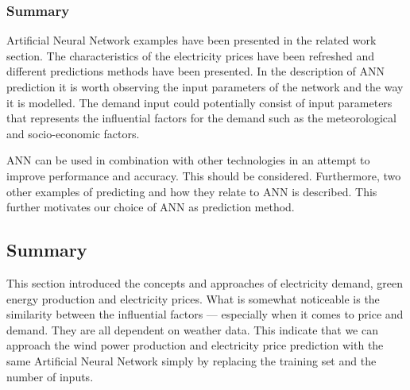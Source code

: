 \subsubsection{Summary}
Artificial Neural Network examples have been presented in the related work section. The characteristics of the electricity prices have been refreshed and different predictions methods have been presented. 
In the description of ANN prediction it is worth observing the input parameters of the network and the way it is modelled. The demand input could potentially consist of input parameters that represents the influential factors for the demand such as the meteorological and socio-economic factors.

ANN can be used in combination with other technologies in an attempt to improve performance and accuracy. This should be considered.
Furthermore, two other examples of predicting and how they relate to ANN is described. This further motivates our choice of ANN as prediction method.   

\subsection{Summary}

This section introduced the concepts and approaches of electricity demand, green energy production and electricity prices. What is somewhat noticeable is the similarity between the influential factors --- especially when it comes to price and demand. They are all dependent on weather data. This indicate that we can approach the wind power production and electricity price prediction with the same Artificial Neural Network simply by replacing the training set and the number of inputs.